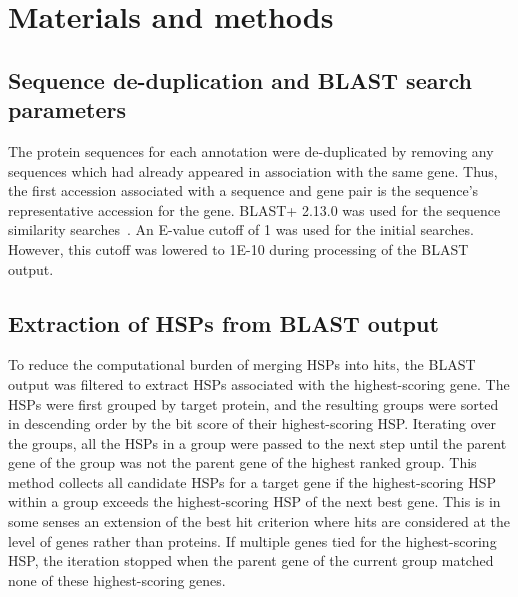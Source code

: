 \documentclass[10pt,letterpaper]{article}
\begin{document}
\section*{Materials and methods}
\subsection*{Sequence de-duplication and BLAST search parameters}
The protein sequences for each annotation were de-duplicated by removing any sequences which had already appeared in association with the same gene. Thus, the first accession associated with a sequence and gene pair is the sequence’s representative accession for the gene. BLAST+ 2.13.0 was used for the sequence similarity searches~\cite{Camacho2009}. An E-value cutoff of 1 was used for the initial searches. However, this cutoff was lowered to 1E-10 during processing of the BLAST output.

\subsection*{Extraction of HSPs from BLAST output}
To reduce the computational burden of merging HSPs into hits, the BLAST output was filtered to extract HSPs associated with the highest-scoring gene. The HSPs were first grouped by target protein, and the resulting groups were sorted in descending order by the bit score of their highest-scoring HSP. Iterating over the groups, all the HSPs in a group were passed to the next step until the parent gene of the group was not the parent gene of the highest ranked group. This method collects all candidate HSPs for a target gene if the highest-scoring HSP within a group exceeds the highest-scoring HSP of the next best gene. This is in some senses an extension of the best hit criterion where hits are considered at the level of genes rather than proteins. If multiple genes tied for the highest-scoring HSP, the iteration stopped when the parent gene of the current group matched none of these highest-scoring genes.
\end{document}

